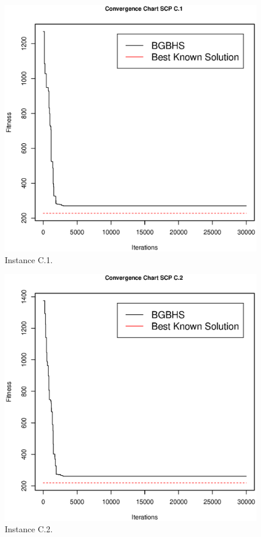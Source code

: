 \begin{figure}[]
\centering
\includegraphics[scale=.45]{Resultados/scpC1.eps}
\caption{Instance C.1.}
\label{fig:Instance.C.1}
\end{figure}

\begin{figure}[]
\centering
\includegraphics[scale=.45]{Resultados/scpC2.eps}
\caption{Instance C.2.}
\label{fig:Instance.C.2}
\end{figure}

